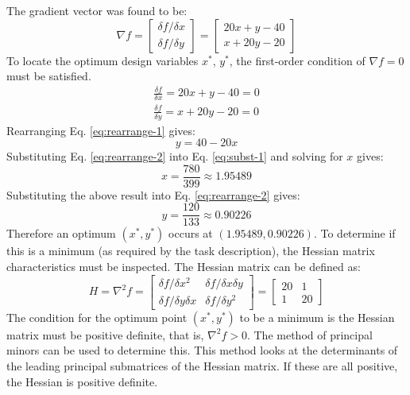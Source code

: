 \documentclass{article}
\begin{document}
The gradient vector was found to be:
\begin{equation*}
    \nabla f = \begin{bmatrix}\delta f / \delta x \\ \delta f / \delta y\end{bmatrix} = \begin{bmatrix} 20x + y - 40\\ x + 20y - 20\end{bmatrix}
\end{equation*}
To locate the optimum design variables $x^{*}$, $y^{*}$, the first-order condition of $\nabla f = 0$ must be satisfied.
\begin{eqnarray}\label{eq:rearrange-1}
    \frac{\delta f}{\delta x} = 20x + y - 40 = 0 \\\label{eq:subst-1}
    \frac{\delta f}{\delta y} = x + 20y - 20 = 0
\end{eqnarray}
Rearranging Eq. \ref{eq:rearrange-1} gives:
\begin{equation}\label{eq:rearrange-2}
    y = 40 - 20x
\end{equation}
Substituting Eq. \ref{eq:rearrange-2} into Eq. \ref{eq:subst-1} and solving for $x$ gives:
\begin{equation*}
    x = \frac{780}{399} \approx 1.95489
\end{equation*}
Substituting the above result into Eq. \ref{eq:rearrange-2} gives:
\begin{equation*}
    y = \frac{120}{133} \approx 0.90226
\end{equation*}
Therefore an optimum $(x^{*}, y^{*})$ occurs at $(1.95489, 0.90226)$. To determine if this is a minimum (as required by the task description), the Hessian matrix characteristics must be inspected. The Hessian matrix can be defined as:
\begin{equation*}
    H = \nabla^{2}f = \begin{bmatrix} 
\delta f / \delta x^{2} & \delta f / \delta x \delta y \\
\delta f / \delta y \delta x & \delta f / \delta y^{2}
\end{bmatrix} = \begin{bmatrix}20 & 1 \\ 1 & 20\end{bmatrix}
\end{equation*}
The condition for the optimum point $(x^{*}, y^{*})$ to be a minimum is the Hessian matrix must be positive definite, that is, $\nabla^{2} f > 0$. The method of principal minors can be used to determine this. This method looks at the determinants of the leading principal submatrices of the Hessian matrix. If these are all positive, the Hessian is positive definite.
\end{document}
